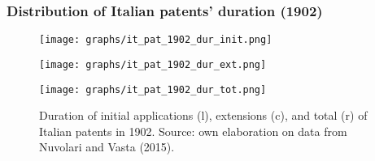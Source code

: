 \documentclass[10pt]{beamer}
\begin{document}
\begin{frame}[label = duration]
    \frametitle{Distribution of Italian patents' duration (1902)}

\begin{figure}[h]
    \centering
    \begin{minipage}{0.32\textwidth}
        \centering
        \texttt{[image: graphs/it\_pat\_1902\_dur\_init.png]}
        \label{fig:figure1}
    \end{minipage}\hfill
    \begin{minipage}{0.32\textwidth}
        \centering
        \texttt{[image: graphs/it\_pat\_1902\_dur\_ext.png]}
        \label{fig:figure2}
    \end{minipage}\hfill
    \begin{minipage}{0.32\textwidth}
        \centering
        \texttt{[image: graphs/it\_pat\_1902\_dur\_tot.png]}
        \label{fig:figure3}
    \end{minipage}
    \caption{Duration of initial applications (l), extensions (c), and total (r) of Italian patents in 1902. Source: own elaboration on data from Nuvolari and Vasta (2015).}


\end{figure}

\hyperlink{other_dimensions}{}
    
\end{frame}
\end{document}

